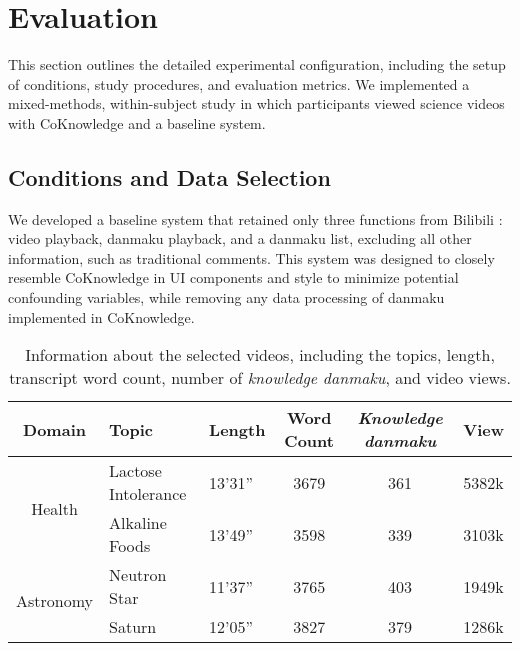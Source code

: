 \section{Evaluation}

This section outlines the detailed experimental configuration, including the setup of conditions, study procedures, and evaluation metrics. We implemented a mixed-methods, within-subject study in which participants viewed science videos with CoKnowledge and a baseline system.

\subsection{Conditions and Data Selection}
We developed a baseline system that retained only three functions from Bilibili \cite{bilibili_about_us}: video playback, danmaku playback, and a danmaku list, excluding all other information, such as traditional comments. This system was designed to closely resemble CoKnowledge in UI components and style to minimize potential confounding variables, while removing any data processing of danmaku implemented in CoKnowledge.

\begin{table*}[h]
\centering
\begin{tabular}{c l l c c l}
\hline
\multicolumn{1}{c}{\textbf{Domain}} & \textbf{Topic}               & \textbf{Length}  & \textbf{Word Count} & \textbf{\textit{Knowledge danmaku}} & \textbf{View}  \\ \hline
\multirow{2}{*}{Health}    & Lactose Intolerance & 13'31'' & 3679                           & 361                                   & 5382k \\ \cline{2-6} 
                           & Alkaline Foods      & 13'49'' & 3598                           & 339                                   & 3103k \\ \hline
\multirow{2}{*}{Astronomy} & Neutron Star        & 11'37'' & 3765                           & 403                                   & 1949k \\ \cline{2-6} 
                           & Saturn              & 12'05'' & 3827                           & 379                                   & 1286k \\ \hline
\end{tabular}
\caption{Information about the selected videos, including the topics, length, transcript word count, number of \textit{knowledge danmaku}, and video views.}
\label{video}
\end{table*}


